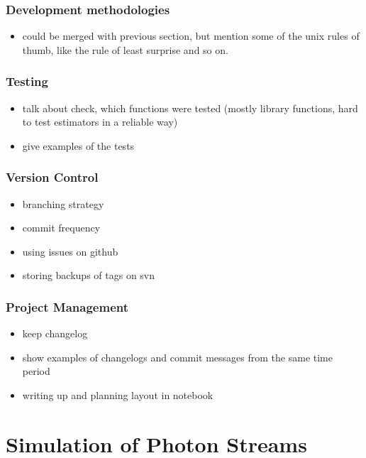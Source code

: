 \documentclass[a4paper,11pt]{article}
\begin{document}
\subsubsection{Development methodologies}
\label{sec-3-2-2}

\begin{itemize}
\item could be merged with previous section, but mention some of the unix rules of
  thumb, like the rule of least surprise and so on.
\end{itemize}
\subsubsection{Testing}
\label{sec-3-2-3}

\begin{itemize}
\item talk about check, which functions were tested (mostly library functions, hard
  to test estimators in a reliable way)
\item give examples of the tests
\end{itemize}
\subsubsection{Version Control}
\label{sec-3-2-4}

\begin{itemize}
\item branching strategy
\item commit frequency
\item using issues on github
\item storing backups of tags on svn
\end{itemize}
\subsubsection{Project Management}
\label{sec-3-2-5}

\begin{itemize}
\item keep changelog
\item show examples of changelogs and commit messages from the same time period
\item writing up and planning layout in notebook
\end{itemize}
\section{Simulation of Photon Streams}
\label{sec-4}
\end{document}
